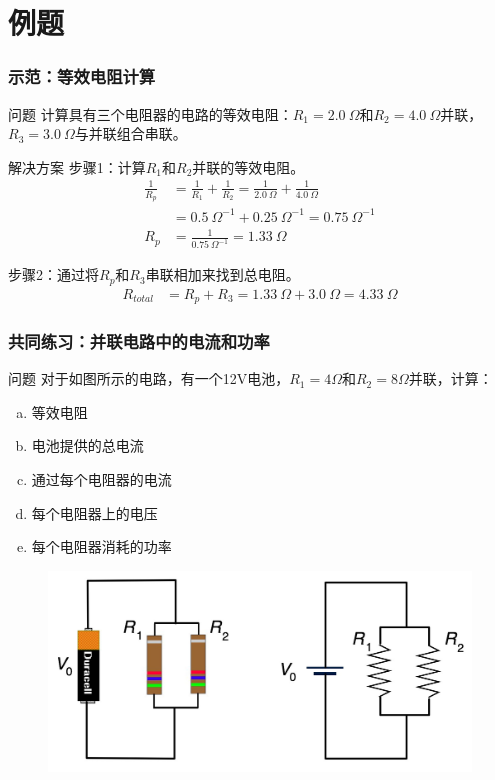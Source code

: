 \documentclass{beamer}
\begin{document}
\section{例题}
\begin{frame}
    \frametitle{示范：等效电阻计算}
    \begin{block}{问题}
        计算具有三个电阻器的电路的等效电阻：$R_1 = 2.0~\Omega$和$R_2 = 4.0~\Omega$并联，$R_3 = 3.0~\Omega$与并联组合串联。
    \end{block}
    \begin{block}{解决方案}
        步骤1：计算$R_1$和$R_2$并联的等效电阻。
        \begin{align*}
            \frac{1}{R_p} &= \frac{1}{R_1} + \frac{1}{R_2} = \frac{1}{2.0~\Omega} + \frac{1}{4.0~\Omega}\\
            &= 0.5~\Omega^{-1} + 0.25~\Omega^{-1} = 0.75~\Omega^{-1}\\
            R_p &= \frac{1}{0.75~\Omega^{-1}} = 1.33~\Omega
        \end{align*}
        
        步骤2：通过将$R_p$和$R_3$串联相加来找到总电阻。
        \begin{align*}
            R_{total} &= R_p + R_3 = 1.33~\Omega + 3.0~\Omega = 4.33~\Omega
        \end{align*}
    \end{block}
\end{frame}

\begin{frame}
    \frametitle{共同练习：并联电路中的电流和功率}
    \begin{block}{问题}
        对于如图所示的电路，有一个12V电池，$R_1 = 4\Omega$和$R_2 = 8\Omega$并联，计算：
        \begin{enumerate}[(a)]
            \item 等效电阻
            \item 电池提供的总电流
            \item 通过每个电阻器的电流
            \item 每个电阻器上的电压
            \item 每个电阻器消耗的功率
        \end{enumerate}
    \end{block}
    \begin{figure}
        \centering
        \includegraphics[width=0.5\linewidth]{phys12-circuits-parallel-circuit-with-battery.jpg}
    \end{figure}
\end{frame}
\end{document}
